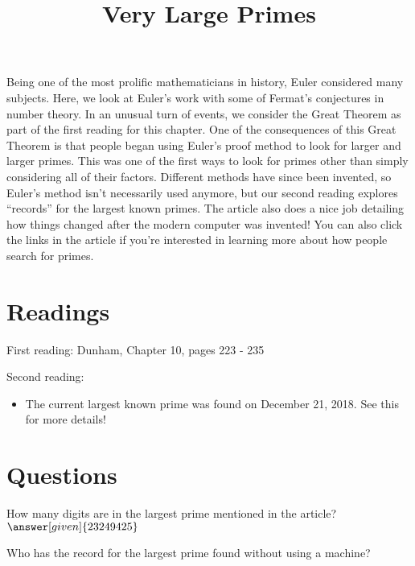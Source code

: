 \documentclass[nooutcomes]{ximera}
\title{Very Large Primes}
\begin{document}
\begin{abstract}
    
\end{abstract}
\maketitle

Being one of the most prolific mathematicians in history, Euler considered many subjects.  Here, we look at Euler's work with some of Fermat's conjectures in number theory.  In an unusual turn of events, we consider the Great Theorem as part of the first reading for this chapter.  One of the consequences of this Great Theorem is that people began using Euler's proof method to look for larger and larger primes.  This was one of the first ways to look for primes other than simply considering all of their factors.  Different methods have since been invented, so Euler's method isn't necessarily used anymore, but our second reading explores ``records'' for the largest known primes.  The article also does a nice job detailing how things changed after the modern computer was invented!  You can also click the links in the article if you're interested in learning more about how people search for primes.


\section{Readings}
First reading: Dunham, Chapter 10, pages 223 - 235

Second reading: 

\begin{itemize}
	\item The current largest known prime was found on December 21, 2018.  See this  for more details!
\end{itemize}



\section{Questions}

\begin{question}
How many digits are in the largest prime mentioned in the article? $\answer[given]{23249425}$
\end{question}

\begin{question}
Who has the record for the largest prime found without using a machine?
\begin{multipleChoice}
\end{multipleChoice}
\end{question}


%
\end{document}
